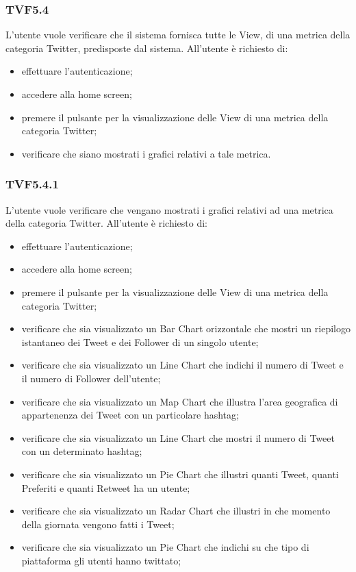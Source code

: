 		\subsubsection{TVF5.4}
			L'utente vuole verificare che il sistema fornisca tutte le View, di una metrica della categoria Twitter, predisposte dal sistema. All'utente è richiesto di:
			\begin{itemize}
				\item effettuare l'autenticazione;
				\item accedere alla home screen;
				\item premere il pulsante per la visualizzazione delle View di una metrica della categoria Twitter;
				\item verificare che siano mostrati i grafici relativi a tale metrica.
			\end{itemize}
			
		\subsubsection{TVF5.4.1}
			L'utente vuole verificare che vengano mostrati i grafici relativi ad una metrica della categoria Twitter. All'utente è richiesto di:
			\begin{itemize}
				\item effettuare l'autenticazione;
				\item accedere alla home screen;
				\item premere il pulsante per la visualizzazione delle View di una metrica della categoria Twitter;
				\item verificare che sia visualizzato un Bar Chart orizzontale che mostri un riepilogo istantaneo dei Tweet e dei Follower di un singolo utente;
				\item verificare che sia visualizzato un Line Chart che indichi il numero di Tweet e il numero di Follower dell’utente;
				\item verificare che sia visualizzato un Map Chart che illustra l'area geografica di appartenenza dei Tweet con un particolare hashtag;
				\item verificare che sia visualizzato un Line Chart che mostri il numero di Tweet con un determinato hashtag;
				\item verificare che sia visualizzato un Pie Chart che illustri quanti Tweet, quanti Preferiti e quanti Retweet ha un utente;
				\item verificare che sia visualizzato un Radar Chart che illustri in che momento della giornata vengono fatti i Tweet;
				\item verificare che sia visualizzato un Pie Chart che indichi su che tipo di piattaforma gli utenti hanno twittato;
			\end{itemize}
			
